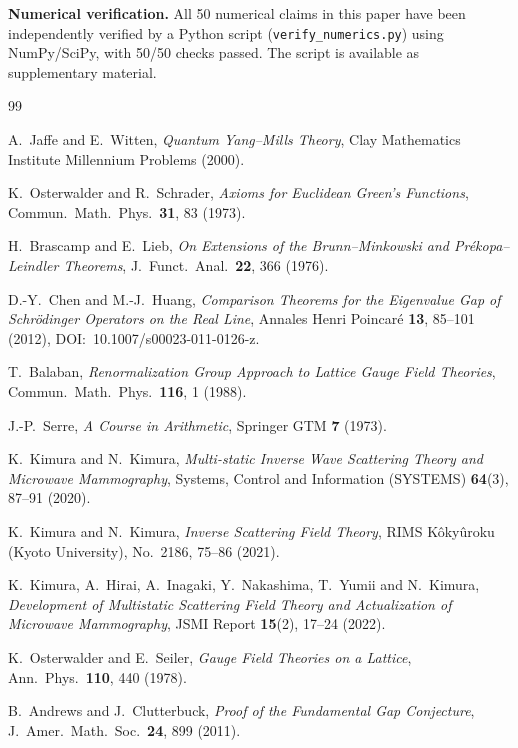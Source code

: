 \documentclass[12pt]{article}
\theoremstyle{plain}
\theoremstyle{definition}
\numberwithin{equation}{section}
\begin{document}
\medskip

\noindent\textbf{Numerical verification.}  All 50 numerical claims in this paper have been independently verified by a Python script (\texttt{verify\_numerics.py}) using NumPy/SciPy, with 50/50 checks passed.  The script is available as supplementary material.

\newpage
\begin{thebibliography}{99}

A.~Jaffe and E.~Witten,
\textit{Quantum Yang--Mills Theory},
Clay Mathematics Institute Millennium Problems (2000).

K.~Osterwalder and R.~Schrader,
\textit{Axioms for Euclidean Green's Functions},
Commun.\ Math.\ Phys.\ \textbf{31}, 83 (1973).

H.~Brascamp and E.~Lieb,
\textit{On Extensions of the Brunn--Minkowski and Pr\'ekopa--Leindler Theorems},
J.~Funct.\ Anal.\ \textbf{22}, 366 (1976).

D.-Y.~Chen and M.-J.~Huang,
\textit{Comparison Theorems for the Eigenvalue Gap of Schr\"odinger Operators on the Real Line},
Annales Henri Poincar\'e \textbf{13}, 85--101 (2012),
DOI:~10.1007/s00023-011-0126-z.

T.~Balaban,
\textit{Renormalization Group Approach to Lattice Gauge Field Theories},
Commun.\ Math.\ Phys.\ \textbf{116}, 1 (1988).

J.-P.~Serre,
\textit{A Course in Arithmetic},
Springer GTM \textbf{7} (1973).

K.~Kimura and N.~Kimura,
\textit{Multi-static Inverse Wave Scattering Theory and Microwave Mammography},
Systems, Control and Information (SYSTEMS) \textbf{64}(3), 87--91 (2020).

K.~Kimura and N.~Kimura,
\textit{Inverse Scattering Field Theory},
RIMS K\^oky\^uroku (Kyoto University), No.~2186, 75--86 (2021).

K.~Kimura, A.~Hirai, A.~Inagaki, Y.~Nakashima, T.~Yumii and N.~Kimura,
\textit{Development of Multistatic Scattering Field Theory and Actualization of Microwave Mammography},
JSMI Report \textbf{15}(2), 17--24 (2022).

K.~Osterwalder and E.~Seiler,
\textit{Gauge Field Theories on a Lattice},
Ann.\ Phys.\ \textbf{110}, 440 (1978).

B.~Andrews and J.~Clutterbuck,
\textit{Proof of the Fundamental Gap Conjecture},
J.~Amer.\ Math.\ Soc.\ \textbf{24}, 899 (2011).

\end{thebibliography}
\end{document}
